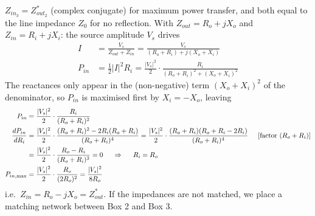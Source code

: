 \begin{enumerate}
    \(Z_{in_3} = Z_{out_2}^*\) (complex conjugate) for maximum power transfer,
    and both equal to the line impedance \(Z_0\) for no reflection. With
    \(Z_{out} = R_o + jX_o\) and \(Z_{in} = R_i + jX_i\):
    the source amplitude \(V_s\) drives
    \begin{align*}
      I &= \frac{V_s}{Z_{out} + Z_{in}} = \frac{V_s}{(R_o + R_i) + j(X_o + X_i)} \\
      P_{in} &= \frac{1}{2}|I|^2 R_i = \frac{|V_s|^2}{2} \cdot \frac{R_i}{(R_o + R_i)^2 + (X_o + X_i)^2}
    \end{align*}
    The reactances only appear in the (non-negative) term \((X_o + X_i)^2\) of the
    denominator, so \(P_{in}\) is maximised first by \(X_i = -X_o\), leaving
    \begin{align*}
      P_{in} &= \frac{|V_s|^2}{2} \cdot \frac{R_i}{(R_o + R_i)^2} \\
      \frac{dP_{in}}{dR_i} &= \frac{|V_s|^2}{2} \cdot \frac{(R_o + R_i)^2 - 2R_i(R_o + R_i)}{(R_o + R_i)^4}
      = \frac{|V_s|^2}{2} \cdot \frac{(R_o + R_i)(R_o + R_i - 2R_i)}{(R_o + R_i)^4} \hspace{0.5cm} [\text{factor } (R_o + R_i)] \\
      &= \frac{|V_s|^2}{2} \cdot \frac{R_o - R_i}{(R_o + R_i)^3} = 0
      \hspace{0.5cm} \Rightarrow \hspace{0.5cm} R_i = R_o \\
      P_{in,\text{max}} &= \frac{|V_s|^2}{2} \cdot \frac{R_o}{(2R_o)^2} = \frac{|V_s|^2}{8R_o}
    \end{align*}
    i.e.\ \(Z_{in} = R_o - jX_o = Z_{out}^*\). If the
    impedances are not matched, we place a matching network between Box 2
    and Box 3.
\end{enumerate}

